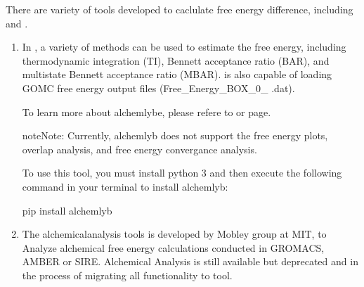 \documentclass[letterpaper,10pt,english]{sphinxmanual}
\begin{document}
\sphinxAtStartPar
There are variety of tools developed to caclulate free energy difference, including
 and
 .
\begin{enumerate}
%
\item {} 
\sphinxAtStartPar
{}

\sphinxAtStartPar
In  , a variety of methods can be
used to estimate the free energy, including thermodynamic integration (TI),
Bennett acceptance ratio (BAR), and multistate Bennett acceptance ratio (MBAR).
  is also capable of loading GOMC
free energy output files (Free\_Energy\_BOX\_0\_ .dat).

\sphinxAtStartPar
To learn more about alchemlybe, please refere to 
or  page.

\begin{sphinxadmonition}{note}{Note:}
\sphinxAtStartPar
Currently, alchemlyb does not support the free energy plots, overlap analysis,
and free energy convergance analysis.
\end{sphinxadmonition}

\sphinxAtStartPar
To use this tool, you must install python 3 and then execute the following command in
your terminal to install alchemlyb:

\begin{sphinxVerbatim}[commandchars=\\\{\}]
\PYGZdl{} pip install alchemlyb
\end{sphinxVerbatim}

\item {} 
\sphinxAtStartPar
{}

\sphinxAtStartPar
The alchemical\sphinxhyphen{}analysis tools is developed by Mobley group at MIT, to Analyze alchemical free energy
calculations conducted in GROMACS, AMBER or SIRE. Alchemical Analysis is still available but deprecated and
in the process of migrating all functionality to  tool.


\end{enumerate}
\end{document}
